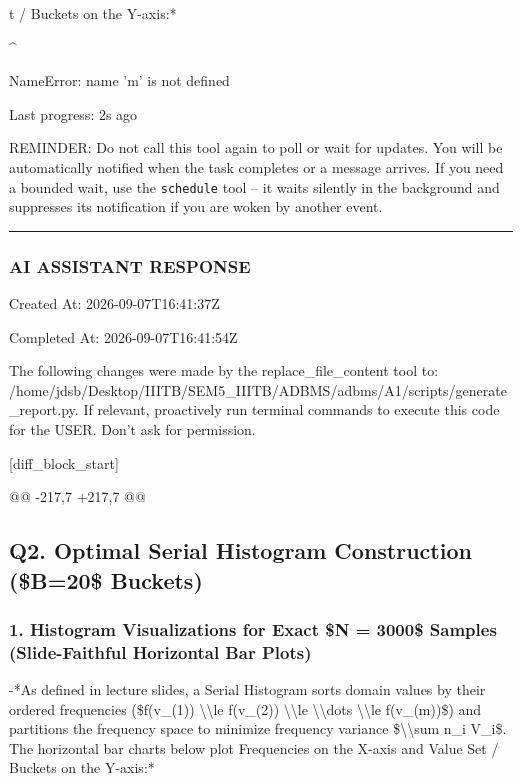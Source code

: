 \documentclass[11pt,a4paper]{article}
\begin{document}
t / Buckets on the Y-axis:*


\textasciicircum{}

NameError: name 'm' is not defined


Last progress: 2s ago



REMINDER: Do not call this tool again to poll or wait for updates. You will be automatically notified when the task completes or a message arrives. If you need a bounded wait, use the \texttt{schedule} tool -- it waits silently in the background and suppresses its notification if you are woken by another event.


\hrule

\subsubsection{AI ASSISTANT RESPONSE}

Created At: 2026-09-07T16:41:37Z

Completed At: 2026-09-07T16:41:54Z

The following changes were made by the replace\_file\_content tool to: /home/jdsb/Desktop/IIITB/SEM5\_IIITB/ADBMS/adbms/A1/scripts/generate\_report.py. If relevant, proactively run terminal commands to execute this code for the USER. Don't ask for permission.

[diff\_block\_start]

@@ -217,7 +217,7 @@

\subsection{Q2. Optimal Serial Histogram Construction (\$B=20\$ Buckets)}

\subsubsection{1. Histogram Visualizations for Exact \$N = 3000\$ Samples (Slide-Faithful Horizontal Bar Plots)}
-*As defined in lecture slides, a Serial Histogram sorts domain values by their ordered frequencies (\$f(v\_{(1)}) \textbackslash{}\textbackslash{}le f(v\_{(2)}) \textbackslash{}\textbackslash{}le \textbackslash{}\textbackslash{}dots \textbackslash{}\textbackslash{}le f(v\_{(m)})\$) and partitions the frequency space to minimize frequency variance \$\textbackslash{}\textbackslash{}sum n\_i V\_i\$. The horizontal bar charts below plot Frequencies on the X-axis and Value Set / Buckets on the Y-axis:*
\end{document}

